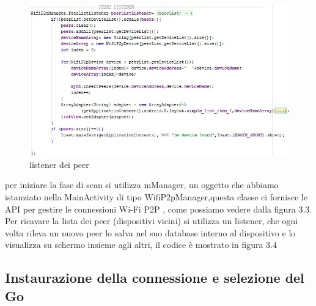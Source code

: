 \begin{figure}
   \caption{listener dei peer}
   \centering
   \includegraphics[width=1\columnwidth]{imgs/peerListener.png}%
\end{figure}
per iniziare la fase di scan si utilizza mManager, un
oggetto che abbiamo istanziato nella MainActivity
di tipo WifiP2pManager,questa classe ci fornisce le API per gestire le connessioni
Wi-Fi P2P \cite{androiddevelopers},
come possiamo vedere dalla figura 3.3.
Per ricavare la lista dei peer (dispositivi vicini)
si utilizza un listener,
che ogni volta rileva un nuovo peer lo salva nel suo database
interno al dispositivo e lo
visualizza su schermo insieme agli altri, il codice è mostrato
in figura 3.4

\subsection{Instaurazione della connessione e selezione del Go}

